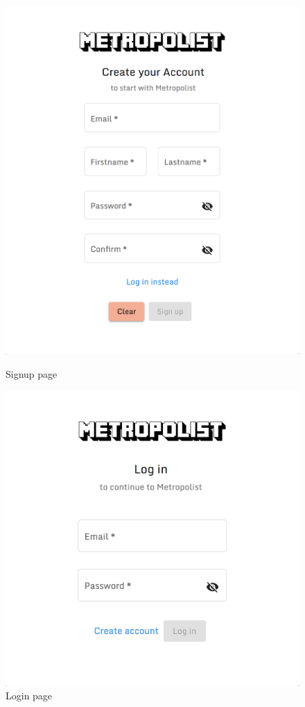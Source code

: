 \begin{enumerate}
  \begin{figure}
  \centering
  \begin{minipage}{.5\textwidth}
    \centering
    \includegraphics[width=\textwidth]{section04/assets/GUI-signup-small.png}
    \caption{Signup page}
    \label{fig:GUI signup}
  \end{minipage}%
  \begin{minipage}{.5\textwidth}
    \centering
    \includegraphics[width=\textwidth]{section04/assets/GUI-login-small.png}
    \caption{Login page}
    \label{fig:GUI login}
  \end{minipage}
  \end{figure}


\end{enumerate}
